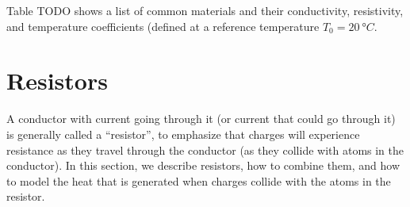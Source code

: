 
Table TODO shows a list of common materials and their conductivity, resistivity, and temperature coefficients (defined at a reference temperature $T_0=\SI{20}{\degree C}$.


\section{Resistors}
A conductor with current going through it (or current that could go through it) is generally called a ``resistor'', to emphasize that charges will experience resistance as they travel through the conductor (as they collide with atoms in the conductor). In this section, we describe resistors, how to combine them, and how to model the heat that is generated when charges collide with the atoms in the resistor.

